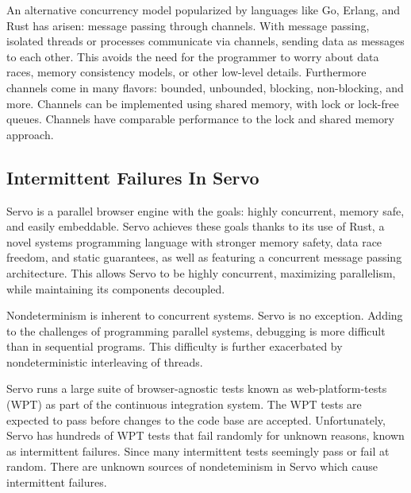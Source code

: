 \documentclass{article}
\begin{document}
An alternative concurrency model popularized by languages like Go, Erlang, and Rust has
arisen: message passing through channels. With message passing, isolated
threads or processes communicate via channels, sending data as messages to each other.
This avoids the need for the programmer to worry about data races, memory consistency
models, or other low-level details. Furthermore channels come in many flavors:
bounded, unbounded, blocking, non-blocking, and more. Channels can be implemented using
shared memory, with lock or lock-free queues. Channels have comparable performance to the
lock and shared memory approach.

\subsection{Intermittent Failures In Servo}
Servo is a parallel browser engine with the goals: highly concurrent,
memory safe, and easily embeddable. Servo achieves these goals thanks to
its use of Rust, a novel systems programming language with stronger memory safety,
data race freedom, and static guarantees, as well as featuring a concurrent message passing
architecture. This allows Servo to be highly concurrent, maximizing parallelism,
while maintaining its components decoupled.

Nondeterminism is inherent to concurrent systems. Servo is no exception. Adding to
the challenges of programming parallel systems, debugging is more difficult than in
sequential programs. This difficulty is further exacerbated by nondeterministic
interleaving of threads.

Servo runs a large suite of browser-agnostic tests known as web-platform-tests (WPT)
as part of the continuous integration system. The WPT tests are expected to pass before
changes to the code base are accepted. Unfortunately, Servo has hundreds of WPT tests that
fail randomly for unknown reasons, known as intermittent failures. Since many intermittent
tests seemingly pass or fail at random. There are unknown sources of nondeteminism in
Servo which cause intermittent failures.
\end{document}
